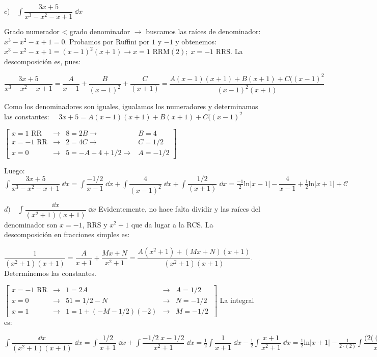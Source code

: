 {\begin{proofw}
$c) \quad \displaystyle \int \dfrac {3x+5}{x^3-x^2-x+1}\; \dd x$

Grado numerador < grado denominador $\to $  buscamos las raíces de denominador: $x^3-x^2-x+1=0$. Probamos por Ruffini por $1$ y $-1$ y obtenemos: $x^3-x^2-x+1=(x-1)^2 (x+1) \to x=1 \text { RRM}(2); \; x=-1 \text{ RRS}$. La descomposición es, pues:

$\displaystyle \dfrac {3x+5}{x^3-x^2-x+1}= \dfrac{A}{x-1}+ \dfrac{B}{(x-1)^2}+ \dfrac{C}{(x+1)}= \dfrac {A(x-1)(x+1)+B (x+1)+C((x-1)^2}{(x-1)^2 (x+1)}$

Como los denominadores son iguales, igualamos los numeradores y determinamos las constantes:
$\quad 3x+5=A(x-1)(x+1)+B (x+1)+C((x-1)^2$

$ \left[ \begin{matrix} 
x=1 \text{ RR} & \to & 8=2B \to & B=4 \\ 
x=-1 \text{ RR} & \to & 2=4C \to & C=1/2 \\
x=0 & \to & 5=-A+4+1/2 \to & A=-1/2  \end{matrix} \right] $

Luego:$\displaystyle \int \dfrac {3x+5}{x^3-x^2-x+1}\; \dd x = 
\int \dfrac{-1/2}{x-1} \; \dd x+ \int \dfrac{4}{(x-1)^2} \; \dd x+ \int \dfrac{1/2}{(x+1)} \; \dd x = \frac {-1}{2} \mathrm{ln} |x-1|-\dfrac {4}{x-1}+\frac 1 2 \mathrm{ln}|x+1|+\mathcal C $


$d) \quad \displaystyle \int \dfrac {\dd x}{(x^2+1)(x+1)} \; \dd x$	Evidentemente, no hace falta dividir y las raíces del denominador son $x=-1$, RRS y $x^2+1$ que da lugar a la RCS. La descomposición en fracciones simples es:

$ \displaystyle \dfrac {1}{(x^2+1)(x+1)} = \dfrac {A}{x+1} + \dfrac {Mx+N}{x^2+1} = \dfrac {A(x^2+1)+(Mx+N)(x+1)}{(x^2+1)(x+1)} $. Determinemos las constantes.

$ \left[ \begin{matrix} 
x=-1 \text{ RR} & \to & 1=2A & \to & A=1/2\\ 
x=0 & \to & 51=1/2-N & \to & N=-1/2\\  
x=1 & \to & 1=1+(-M-1/2)(-2) & \to & M=-1/2\
\end{matrix} \right] $ La integral es:

$\displaystyle \int \dfrac {\dd x}{(x^2+1)(x+1)} \; \dd x= 
\int \dfrac {1/2}{x+1} \; \dd x + \int \dfrac {-1/2\; x- 1/2}{x^2+1} \; \dd x =
\frac 1 2 \int \dfrac {1}{x+1} \; \dd x - \frac 1 2  \int \dfrac { x+1}{x^2+1} \; \dd x =
 \frac 1 2 \mathrm{ln} |x+1| - \frac 1 {2\cdot (2)}  \int \dfrac {(2( (x+1)}{x^2+1} \; \dd x 
  \frac 1 2 \mathrm{ln} |x+1| - \frac 1 {4}  \int \dfrac {(2x)}{x^2+1} \; \dd x - \frac 1 {4}  \int \dfrac {2}{x^2+1} \; \dd x = 
  \frac 1 2 \mathrm{ln} |x+1| - \frac 1 {4} \mathrm{ln} (x^2+1) -\frac 1 {2}  \int \dfrac {1}{x^2+1} = 
   \frac 1 2 \mathrm{ln} |x+1| - \frac 1 {4} \mathrm{ln} (x^2+1) -\frac 1 {2} \arctan x + \mathcal C$


\end{proofw}}
